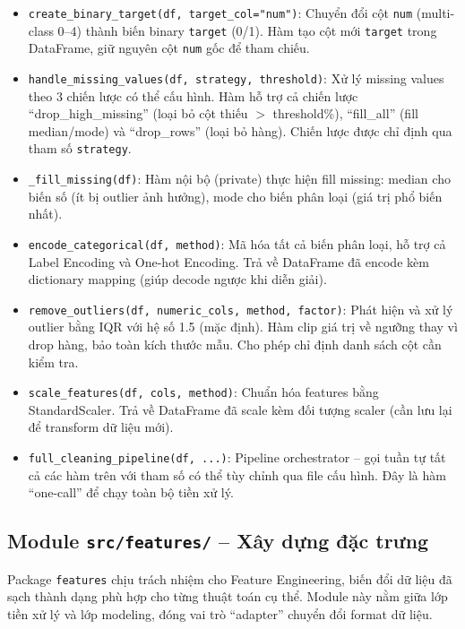 \begin{itemize}
    \item \texttt{create\_binary\_target(df, target\_col="num")}: Chuyển đổi cột \texttt{num} (multi-class 0--4) thành biến binary \texttt{target} (0/1). Hàm tạo cột mới \texttt{target} trong DataFrame, giữ nguyên cột \texttt{num} gốc để tham chiếu.
    \item \texttt{handle\_missing\_values(df, strategy, threshold)}: Xử lý missing values theo 3 chiến lược có thể cấu hình. Hàm hỗ trợ cả chiến lược ``drop\_high\_missing'' (loại bỏ cột thiếu $>$ threshold\%), ``fill\_all'' (fill median/mode) và ``drop\_rows'' (loại bỏ hàng). Chiến lược được chỉ định qua tham số \texttt{strategy}.
    \item \texttt{\_fill\_missing(df)}: Hàm nội bộ (private) thực hiện fill missing: median cho biến số (ít bị outlier ảnh hưởng), mode cho biến phân loại (giá trị phổ biến nhất).
    \item \texttt{encode\_categorical(df, method)}: Mã hóa tất cả biến phân loại, hỗ trợ cả Label Encoding và One-hot Encoding. Trả về DataFrame đã encode kèm dictionary mapping (giúp decode ngược khi diễn giải).
    \item \texttt{remove\_outliers(df, numeric\_cols, method, factor)}: Phát hiện và xử lý outlier bằng IQR với hệ số 1.5 (mặc định). Hàm clip giá trị về ngưỡng thay vì drop hàng, bảo toàn kích thước mẫu. Cho phép chỉ định danh sách cột cần kiểm tra.
    \item \texttt{scale\_features(df, cols, method)}: Chuẩn hóa features bằng StandardScaler. Trả về DataFrame đã scale kèm đối tượng scaler (cần lưu lại để transform dữ liệu mới).
    \item \texttt{full\_cleaning\_pipeline(df, ...)}: Pipeline orchestrator -- gọi tuần tự tất cả các hàm trên với tham số có thể tùy chỉnh qua file cấu hình. Đây là hàm ``one-call'' để chạy toàn bộ tiền xử lý.
\end{itemize}

\subsection{Module \texttt{src/features/} -- Xây dựng đặc trưng}

Package \texttt{features} chịu trách nhiệm cho Feature Engineering, biến đổi dữ liệu đã sạch thành dạng phù hợp cho từng thuật toán cụ thể. Module này nằm giữa lớp tiền xử lý và lớp modeling, đóng vai trò ``adapter'' chuyển đổi format dữ liệu.

